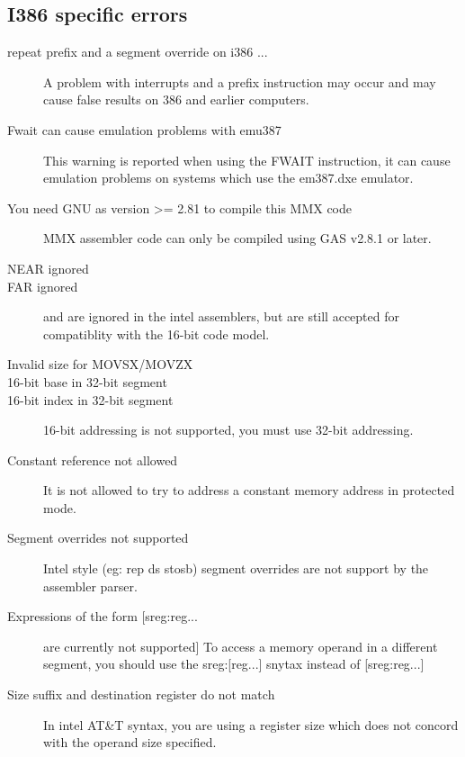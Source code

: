 \subsection{I386 specific errors}

\begin{description}
\item [repeat prefix and a segment override on \var{<=} i386 ...]
A problem with interrupts and a prefix instruction may occur and may cause
false results on 386 and earlier computers.

\item [Fwait can cause emulation problems with emu387]
This warning is reported when using the FWAIT instruction, it can
cause emulation problems on systems which use the em387.dxe emulator.

\item [You need GNU as version >= 2.81 to compile this MMX code]
MMX assembler code can only be compiled using GAS v2.8.1 or later.

\item [NEAR ignored]
\item [FAR ignored]
\label{FarIgnored}
 and  are ignored in the intel assemblers, but are still accepted
for compatiblity with the 16-bit code model.

\item [Invalid size for MOVSX/MOVZX]

\item [16-bit base in 32-bit segment]
\item [16-bit index in 32-bit segment]
16-bit addressing is not supported, you must use 32-bit addressing.


\item [Constant reference not allowed]
It is not allowed to try to address a constant memory address in protected
mode.

\item [Segment overrides not supported]
Intel style (eg: rep ds stosb) segment overrides are not support by
the assembler parser.

\item [Expressions of the form [sreg:reg...] are currently not supported]
To access a memory operand in a different segment, you should use the
sreg:[reg...] snytax instead of [sreg:reg...]

\item [Size suffix and destination register do not match]
In intel AT\&T syntax, you are using a register size which does
not concord with the operand size specified.


\end{description}
